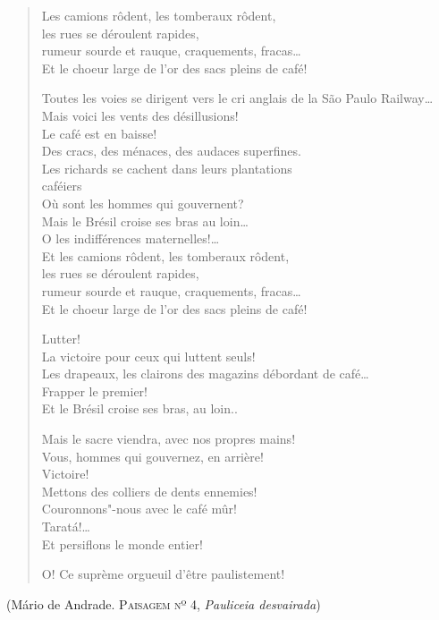 \begin{verse}
Les camions rôdent, les tomberaux rôdent,\\
les rues se déroulent rapides,\\
rumeur sourde et rauque, craquements, fracas\ldots{}\\
Et le choeur large de l'or des sacs pleins de café!

Toutes les voies se dirigent vers le cri anglais de la São Paulo Railway\ldots{}\\
Mais voici les vents des désillusions!\\
Le café est en baisse!\\
Des cracs, des ménaces, des audaces superfines.\\
Les richards se cachent dans leurs plantations\\
\qquad\qquad\qquad\qquad\qquad\qquad caféiers\\
Où sont les hommes qui gouvernent?\\
Mais le Brésil croise ses bras au loin\ldots{}\\
O les indifférences maternelles!\ldots{}\\

Et les camions rôdent, les tomberaux rôdent,\\
les rues se déroulent rapides,\\
rumeur sourde et rauque, craquements, fracas\ldots{}\\
Et le choeur large de l'or des sacs pleins de café!

Lutter!\\
La victoire pour ceux qui luttent seuls!\\
Les drapeaux, les clairons des magazins débordant de café\ldots{}\\
Frapper le premier!\\
Et le Brésil croise ses bras, au loin..

Mais le sacre viendra, avec nos propres mains!\\
Vous, hommes qui gouvernez, en arrière!\\
Victoire!\\
Mettons des colliers de dents ennemies!\\
Couronnons"-nous avec le café mûr!\\
Taratá!\ldots{}\\
Et persiflons le monde entier!

O! Ce suprème orgueuil d'être paulistement!
\end{verse}

\hfill(Mário de Andrade\textsc{. Paisagem nº 4,} \emph{Pauliceia desvairada}\textsc{)}
